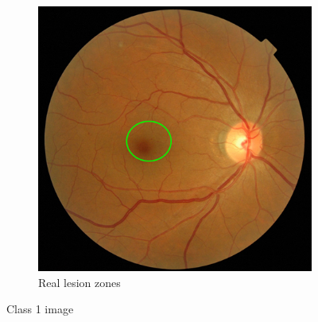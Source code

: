 \documentclass[review]{elsarticle}
\theoremstyle{definition} %
\theoremstyle{remark}
\begin{document}
\begin{figure}[h!]
\begin{subfigure}[b]{0.28\textwidth}
		\includegraphics[width=\textwidth]{./figures/ica_retine_maps/G1-P2/metge.png}
		\caption{Real lesion zones}	
	\end{subfigure}
	\hfill 
	\caption{Class 1 image}  
	\label{fig:ica_components_class1_from} 
\end{figure}
\end{document}
